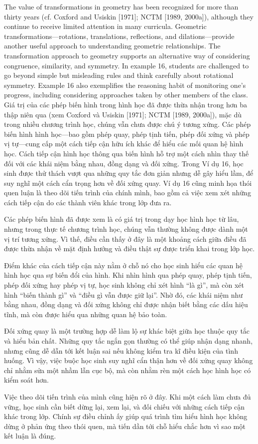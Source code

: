 \documentclass[
  10pt,
  a4paper,
  landscape,
  twoside,
  openany
]{scrbook}
\newcommand{\EN}[1]{#1}
\newcommand{\VI}[1]{#1}
\newcommand{\NOTE}[1]{#1}
\newcounter{example}
\begin{document}
\TriPara
{
\EN{The value of transformations in geometry has been recognized for more than thirty years (cf. Coxford and Usiskin [1971]; NCTM [1989, 2000a]), although they continue to receive limited attention in many curricula. Geometric transformations---rotations, translations, reflections, and dilations---provide another useful approach to understanding geometric relationships. The transformation approach to geometry supports an alternative way of considering congruence, similarity, and symmetry. In example 16, students are challenged to go beyond simple but misleading rules and think carefully about rotational symmetry. Example 16 also exemplifies the reasoning habit of monitoring one's progress, including considering approaches taken by other members of the class.}
}
{
\VI{Giá trị của các phép biến hình trong hình học đã được thừa nhận trong hơn ba thập niên qua (xem Coxford và Usiskin [1971]; NCTM [1989, 2000a]), mặc dù trong nhiều chương trình học, chúng vẫn chưa được chú ý tương xứng. Các phép biến hình hình học---bao gồm phép quay, phép tịnh tiến, phép đối xứng và phép vị tự---cung cấp một cách tiếp cận hữu ích khác để hiểu các mối quan hệ hình học. Cách tiếp cận hình học thông qua biến hình hỗ trợ một cách nhìn thay thế đối với các khái niệm bằng nhau, đồng dạng và đối xứng. Trong Ví dụ 16, học sinh được thử thách vượt qua những quy tắc đơn giản nhưng dễ gây hiểu lầm, để suy nghĩ một cách cẩn trọng hơn về đối xứng quay. Ví dụ 16 cũng minh họa thói quen luận là theo dõi tiến trình của chính mình, bao gồm cả việc xem xét những cách tiếp cận do các thành viên khác trong lớp đưa ra.}
}
{
\NOTE{Các phép biến hình đã được xem là có giá trị trong dạy học hình học từ lâu, nhưng trong thực tế chương trình học, chúng vẫn thường không được dành một vị trí tương xứng. Vì thế, điều cần thấy ở đây là một khoảng cách giữa điều đã được thừa nhận về mặt định hướng và điều thật sự được triển khai trong lớp học.

Điểm khác của cách tiếp cận này nằm ở chỗ nó cho học sinh hiểu các quan hệ hình học qua sự biến đổi của hình. Khi nhìn hình qua phép quay, phép tịnh tiến, phép đối xứng hay phép vị tự, học sinh không chỉ xét hình ``là gì'', mà còn xét hình ``biến thành gì'' và ``điều gì vẫn được giữ lại''. Nhờ đó, các khái niệm như bằng nhau, đồng dạng và đối xứng không chỉ được nhận biết bằng các dấu hiệu tĩnh, mà còn được hiểu qua những quan hệ bảo toàn.

Đối xứng quay là một trường hợp dễ làm lộ sự khác biệt giữa học thuộc quy tắc và hiểu bản chất. Những quy tắc ngắn gọn thường có thể giúp nhận dạng nhanh, nhưng cũng dễ dẫn tới kết luận sai nếu không kiểm tra kĩ điều kiện của tình huống. Vì vậy, việc buộc học sinh suy nghĩ cẩn thận hơn về đối xứng quay không chỉ nhằm sửa một nhầm lẫn cục bộ, mà còn nhằm rèn một cách học hình học có kiểm soát hơn.

Việc theo dõi tiến trình của mình cũng hiện rõ ở đây. Khi một cách làm chưa đủ vững, học sinh cần biết dừng lại, xem lại, và đối chiếu với những cách tiếp cận khác trong lớp. Chính sự điều chỉnh ấy giúp quá trình tìm hiểu hình học không dừng ở phản ứng theo thói quen, mà tiến dần tới chỗ hiểu chắc hơn vì sao một kết luận là đúng.}
}
\end{document}
